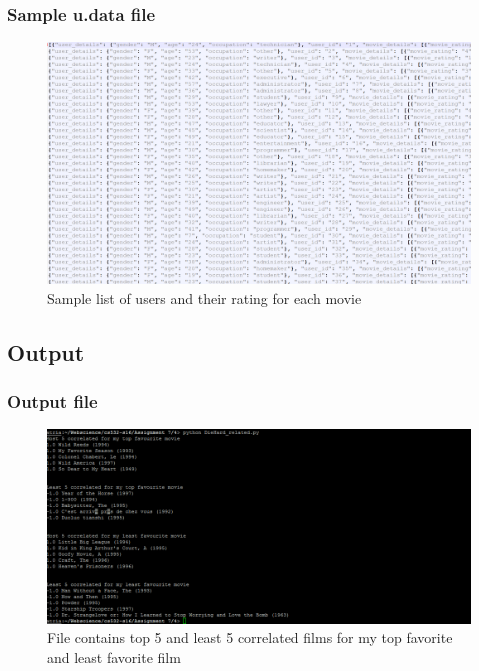 \subsubsection{Sample u.data file}
\begin{figure}[ht]    
    \begin{center}
        \includegraphics[scale=0.4]{sample_udata.png}
        \caption{Sample list of users and their rating for each movie}
        \label{Sample4_t2}
    \end{center}
\end{figure}
\newpage

\subsection{Output}
\subsubsection{Output file}
\begin{figure}[ht]    
    \begin{center}
        \includegraphics[scale=0.6]{output4.png}
        \caption{File contains top 5 and least 5 correlated films for my top favorite and least favorite film}
        \label{graph41}
    \end{center}
\end{figure}
\newpage
